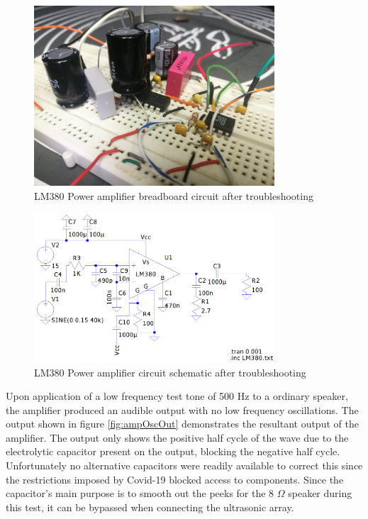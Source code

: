 \begin{figure}[ht!]
    \centering
    \includegraphics[width=0.8\textwidth]{Figures/Implementation/Amplifier/ampbbcirc.jpg}
    \caption{LM380 Power amplifier breadboard circuit after troubleshooting}
    \label{fig:ampbbCirc}
\end{figure}

\begin{figure}[ht!]
    \centering
    \includegraphics[width=0.8\textwidth]{Figures/Implementation/Amplifier/Lm380Mod.png}
    \caption{LM380 Power amplifier circuit schematic after troubleshooting}
    \label{fig:ampCircPosttbl}
\end{figure}

Upon application of a low frequency test tone of 500 Hz to a ordinary speaker, the amplifier produced an audible output with no low frequency oscillations. The output shown in figure \ref{fig:ampOscOut} demonstrates the resultant output of the amplifier. The output only shows the positive half cycle of the wave due to the electrolytic capacitor present on the output, blocking the negative half cycle. Unfortunately no alternative capacitors were readily available to correct this since the restrictions imposed by Covid-19 blocked access to components. Since the capacitor's main purpose is to smooth out the peeks for the 8 $\Omega$ speaker during this test, it can be bypassed when connecting the ultrasonic array.

